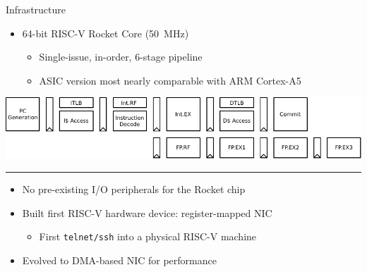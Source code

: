 \begin{block}{Infrastructure}
\begin{minipage}{0.55\linewidth}
\begin{itemize}
\item 64-bit RISC-V Rocket Core (\SI{50}{\mega\hertz})
	\begin{itemize}
	\footnotesize
	\item Single-issue, in-order, 6-stage pipeline
	\item ASIC version most nearly comparable with ARM Cortex-A5
	\end{itemize}
\end{itemize}
\vspace{\baselineskip}
\includegraphics[width=\linewidth]{img/rocket-pipeline.pdf}
\end{minipage}

\hrule
\vspace{0.5\baselineskip}
\begin{itemize}
\item No pre-existing I/O peripherals for the Rocket chip
\item Built first RISC-V hardware device: register-mapped NIC
	\begin{itemize}
	\footnotesize
	\item First \texttt{telnet/ssh} into a physical RISC-V machine
	\end{itemize}
\item Evolved to DMA-based NIC for performance
\end{itemize}
 
\end{block}

